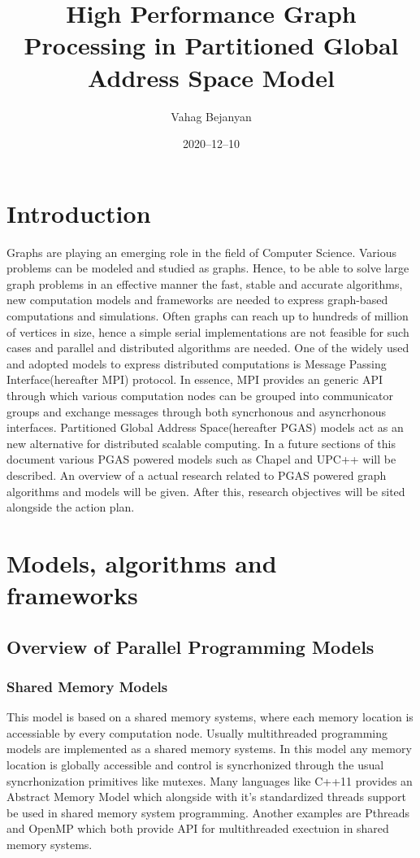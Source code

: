 \documentclass[14pt]{extreport}
\title{High Performance Graph Processing in Partitioned Global Address Space Model}
\date{2020--12--10}
\author{Vahag Bejanyan}
\newcommand\blankpage{
    \null
    \thispagestyle{empty}
    \newpage
    }
\begin{document}
\maketitle
{}
\newpage
{}

\tableofcontents
\blankpage

\section{Introduction}
Graphs are playing an emerging role in the field of Computer Science. Various problems can be modeled and studied as graphs. Hence, to be able to solve large graph problems in an effective manner the fast, stable and accurate algorithms, new computation models and frameworks are needed to express graph-based computations and simulations. Often graphs can reach up to hundreds of million of vertices in size, hence a simple serial implementations are not feasible for such cases and parallel and distributed algorithms are needed. One of the widely used and adopted models to express distributed computations is Message Passing Interface(hereafter MPI) protocol. In essence, MPI provides an generic API through which various computation nodes can be grouped into communicator groups and exchange messages through both syncrhonous and asyncrhonous interfaces. Partitioned Global Address Space(hereafter PGAS) models act as an new alternative for distributed scalable computing. In a future sections of this document various PGAS powered models such as Chapel and UPC++ will be described. An overview of a actual research related to PGAS powered graph algorithms and models will be given. After this, research objectives will be sited alongside the action plan.

\blankpage

\section{Models, algorithms and frameworks}
\subsection{Overview of Parallel Programming Models}
\subsubsection{Shared Memory Models}
This model is based on a shared memory systems, where each memory location is accessiable by every computation node. Usually multithreaded programming models are implemented as a shared memory systems. In this model any memory location is globally accessible and control is syncrhonized through the usual syncrhonization primitives like mutexes. Many languages like C++11 provides an Abstract Memory Model which alongside with it's standardized threads support be used in shared memory system programming. Another examples are Pthreads and OpenMP which both provide API for multithreaded exectuion in shared memory systems.
\end{document}
